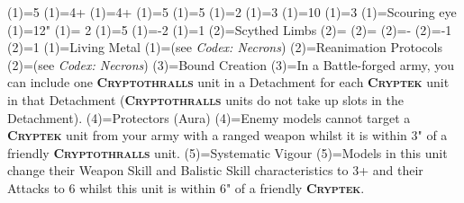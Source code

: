 \renewcommand{\UnitName}{Cryptothralls }%
\renewcommand{\UnitPower}{2}%
\renewcommand{\UnitIcon}{Elites.svg}%
%
\renewcommand{\StatBlocks}{1}%
\Movement(1)={5}%
\WeaponSkill(1)={4+}%
\BalisticSkill(1)={4+}%
\Strength(1)={5}%
\Toughness(1)={5}%
\Wounds(1)={2}%
\Attacks(1)={3}%
\Leadership(1)={10}%
\Save(1)={3}%
%
\renewcommand{\UnitText}{2 \UnitName equiped with: \WeaponName(1); \WeaponName(2).}%
%
%
\renewcommand{\NumWeapon}{2}%
\WeaponName(1)={Scouring eye}%
\WeaponRange(1)={12"}%
\WeaponType(1)={ 2}%
\WeaponStrength(1)={5}%
\WeaponAP(1)={-2}%
\WeaponDamage(1)={1}%
%
\WeaponName(2)={Scythed Limbs}%
\WeaponRange(2)={}%
\WeaponType(2)={}%
\WeaponStrength(2)={-}%
\WeaponAP(2)={-1}%
\WeaponDamage(2)={1}%
%
\renewcommand{\NumAbilities}{3}%
\AbilityName(1)={Living Metal}%
\AbilityDescription(1)={(see \textit{Codex: Necrons})}%
%
\AbilityName(2)={Reanimation Protocols}%
\AbilityDescription(2)={(see \textit{Codex: Necrons})}%
%
\AbilityName(3)={Bound Creation}%
\AbilityDescription(3)={In a Battle-forged army, you can include one \textsc{\textbf{\UnitName}} unit in a Detachment for each \textsc{\textbf{Cryptek}} unit in that Detachment (\textsc{\textbf{\UnitName}} units do not take up slots in the Detachment).}%
%
\AbilityName(4)={Protectors (Aura)}%
\AbilityDescription(4)={Enemy models cannot target a \textsc{\textbf{Cryptek}} unit from your army with a ranged weapon whilst it is within 3" of a friendly \textsc{\textbf{\UnitName}} unit.}%
%
\AbilityName(5)={Systematic Vigour}%
\AbilityDescription(5)={Models in this unit change their Weapon Skill and Balistic Skill characteristics to 3+ and their Attacks to 6 whilst this unit is within 6" of a friendly \textsc{\textbf{Cryptek}}.}%
%
\renewcommand{\FactionKeywords}{Necrons, Canoptek, <Dynasty>}%
\renewcommand{\Keywords}{Infantry, \UnitName}%
\newcommand{\ExtraFrontTitle}{\AbilityName(4)}%
\renewcommand{\ExtraFrontText}{\AbilityDescription(4)}%
\newcommand{\ExtraBackTitle}{\AbilityName(5)}%
\renewcommand{\ExtraBackText}{\AbilityDescription(5)}%
\endinput%